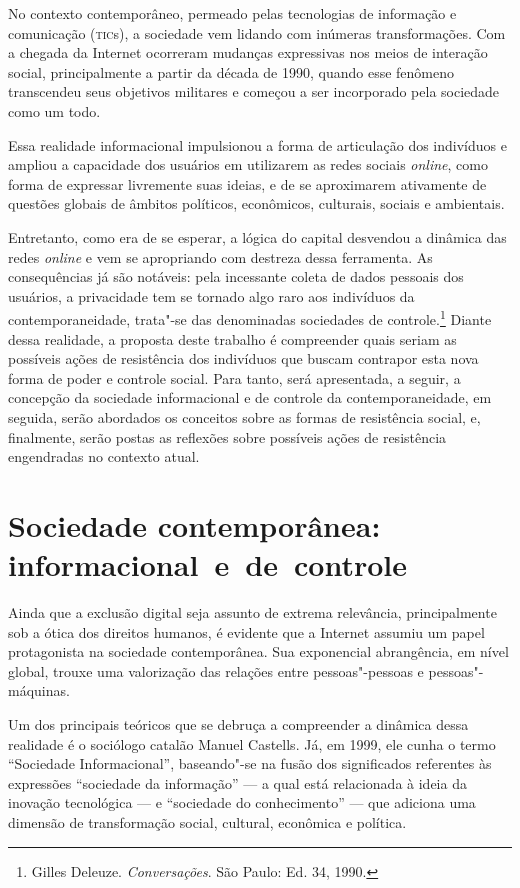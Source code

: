 No contexto contemporâneo, permeado pelas tecnologias de informação e
comunicação (\textsc{tic}s), a sociedade vem lidando com inúmeras transformações.
Com a chegada da Internet ocorreram mudanças expressivas nos meios de
interação social, principalmente a partir da década de 1990, quando esse
fenômeno transcendeu seus objetivos militares e começou a ser
incorporado pela sociedade como um todo.

Essa realidade informacional impulsionou a forma de articulação dos
indivíduos e ampliou a capacidade dos usuários em utilizarem as redes
sociais \textit{online}, como forma de expressar livremente suas ideias, e de se
aproximarem ativamente de questões globais de âmbitos políticos,
econômicos, culturais, sociais e ambientais.

Entretanto, como era de se esperar, a lógica do capital desvendou a
dinâmica das redes \textit{online} e vem se apropriando com destreza dessa
ferramenta. As consequências já são notáveis: pela incessante coleta de
dados pessoais dos usuários, a privacidade tem se tornado algo raro aos
indivíduos da contemporaneidade, trata"-se das denominadas sociedades de
controle.\footnote{Gilles Deleuze. \textit{Conversações}. São Paulo: Ed. 34, 1990.} Diante dessa realidade, a proposta deste
trabalho é compreender quais seriam as possíveis ações de resistência
dos indivíduos que buscam contrapor esta nova forma de poder e controle
social. Para tanto, será apresentada, a seguir, a concepção da sociedade
informacional e de controle da contemporaneidade, em seguida, serão
abordados os conceitos sobre as formas de resistência social, e,
finalmente, serão postas as reflexões sobre possíveis ações de
resistência engendradas no contexto atual.

\section{Sociedade contemporânea: informacional~e~de~controle}

Ainda que a exclusão digital seja assunto de extrema relevância,
principalmente sob a ótica dos direitos humanos, é evidente que a
Internet assumiu um papel protagonista na sociedade contemporânea. Sua
exponencial abrangência, em nível global, trouxe uma valorização das
relações entre pessoas"-pessoas e pessoas"-máquinas.

Um dos principais teóricos que se debruça a compreender a dinâmica dessa
realidade é o sociólogo catalão Manuel Castells. Já, em 1999, ele cunha
o termo ``Sociedade Informacional'', baseando"-se na fusão dos
significados referentes às expressões ``sociedade da informação'' --- a
qual está relacionada à ideia da inovação tecnológica --- e ``sociedade do
conhecimento'' --- que adiciona uma dimensão de transformação social,
cultural, econômica e política.

